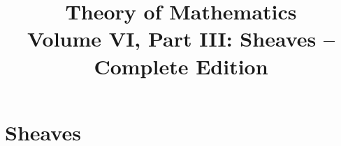 \documentclass[11pt,a4paper,oneside,openany]{book}
\title{Theory of Mathematics\\[0.5em]\Large Volume VI, Part III: Sheaves -- Complete Edition}
\author{}\date{}
\begin{document}
\maketitle\clearpage
\frontmatter\tableofcontents\mainmatter
\part{Sheaves}






\end{document}
